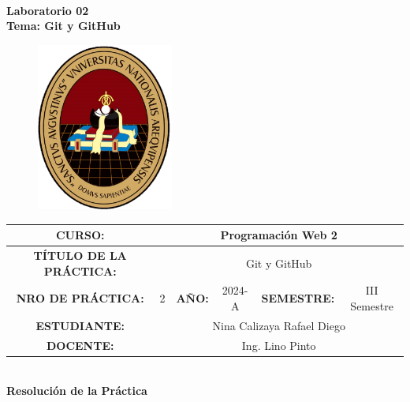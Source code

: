 \documentclass{article}
\begin{document}


\begin{center}
	\Huge \textbf{\\  \Large Laboratorio 02 \\ \Large Tema: Git y GitHub}
\end{center}


\begin{figure}[htbp]
  \centering
  \includegraphics[width=0.4\textwidth]{img/logoUnsa.png}
\end{figure}


\noindent
\renewcommand{\arraystretch}{2}
\begin{table}[h]
\centering
\begin{tabular}{|c|c|c|c|c|c||}
\hline
\multicolumn{1}{|c|}{\textbf{\scriptsize CURSO:}} & \multicolumn{5}{|c|}{\small Programación Web 2} \\ \hline
\multicolumn{1}{|c|}{\textbf{\scriptsize TÍTULO DE LA PRÁCTICA:}} & \multicolumn{5}{|c|}{\small Git y GitHub} \\ \hline
\multicolumn{1}{|c|}{\textbf{\scriptsize NRO DE PRÁCTICA:}} & \multicolumn{1}{|c|}{\small 2}& \multicolumn{1}{|c|}{\textbf{\footnotesize AÑO:}} & \multicolumn{1}{|c|}{\small 2024-A} & \multicolumn{1}{|c|}{\textbf{\footnotesize SEMESTRE:}} & \multicolumn{1}{|c|}{\small III Semestre} \\ \hline \multicolumn{1}{|c|}{\textbf{\scriptsize ESTUDIANTE:}} & \multicolumn{5}{|c|}{\small Nina Calizaya Rafael Diego} \\ \hline  \multicolumn{1}{|c|}{\textbf{\scriptsize DOCENTE:}} & \multicolumn{5}{|c|}{\small Ing. Lino Pinto} \\ \hline
\end{tabular}
\end{table}

\clearpage
\begin{center}
	\Huge \textbf{\\ \Large Resolución de la Práctica \\}
\end{center}
\end{document}
